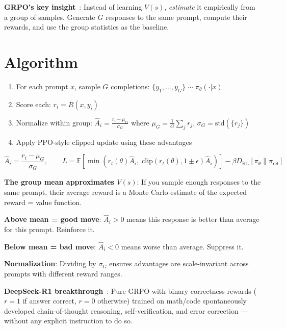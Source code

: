 \textbf{GRPO’s key insight}~\cite{shao2024deepseekmath}: Instead of learning $V(s)$, \emph{estimate} it empirically from a group of samples. Generate $G$ responses to the same prompt, compute their rewards, and use the group statistics as the baseline.

\section{Algorithm}
\label{algorithm}

\begin{enumerate}
  \item For each prompt $x$, sample $G$ completions: $\{y_1, \ldots, y_G\} \sim \pi_\theta(\cdot|x)$
  \item Score each: $r_i = R(x, y_i)$
  \item Normalize within group: $\hat{A}_i = \frac{r_i - \mu_G}{\sigma_G}$ where $\mu_G = \frac{1}{G}\sum_j r_j$, $\sigma_G = \text{std}(\{r_j\})$
  \item Apply PPO-style clipped update using these advantages
\end{enumerate}

\begin{equation}
\boxed{\hat{A}_i = \frac{r_i - \mu_G}{\sigma_G}, \qquad L = \mathbb{E}\left[\min\left(r_t(\theta)\hat{A}_i,\; \text{clip}(r_t(\theta), 1{\pm}\epsilon)\hat{A}_i\right)\right] - \beta D_\text{KL}[\pi_\theta\|\pi_\text{ref}]}
\end{equation}

\begin{intuitionbox}
\textbf{The group mean approximates $V(s)$}: If you sample enough responses to the same prompt, their average reward is a Monte Carlo estimate of the expected reward = value function.

\textbf{Above mean = good move}: $\hat{A}_i > 0$ means this response is better than average for this prompt. Reinforce it.

\textbf{Below mean = bad move}: $\hat{A}_i < 0$ means worse than average. Suppress it.

\textbf{Normalization}: Dividing by $\sigma_G$ ensures advantages are scale-invariant across prompts with different reward ranges.

\textbf{DeepSeek-R1 breakthrough}~\cite{deepseek2025r1}: Pure GRPO with binary correctness rewards ($r = 1$ if answer correct, $r = 0$ otherwise) trained on math/code spontaneously developed chain-of-thought reasoning, self-verification, and error correction --- without any explicit instruction to do so.
\end{intuitionbox}

